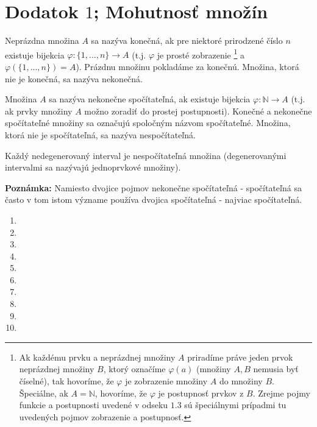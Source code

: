 \chapter{Dodatok $1$; Mohutnosť množín}

Neprázdna množina $A$ sa nazýva konečná, ak pre niektoré prirodzené číslo $n$ existuje bijekcia $\varphi:\{1,...,n\}\rightarrow A$ (t.j. $\varphi$ je prosté zobrazenie \footnote{Ak každému prvku a neprázdnej množiny $A$ priradíme práve jeden prvok neprázdnej množiny $B$, ktorý označíme $\varphi (a)$ (množiny $A,B$ nemusia byť číselné), tak hovoríme, že $\varphi$ je zobrazenie množiny $A$ do množiny $B$. Špeciálne, ak $A=\mathbb{N}$, hovoríme, že $\varphi$ je postupnosť prvkov z $B$. Zrejme pojmy funkcie a postupnosti uvedené v odseku $1.3$ sú špeciálnymi prípadmi tu uvedených pojmov zobrazenie a postupnosť.} a $\varphi(\{1,...,n\})=A$). Prázdnu množinu pokladáme za konečnú. Množina, ktorá nie je konečná, sa nazýva nekonečná.

Množina $A$ sa nazýva nekonečne spočítateľná, ak existuje bijekcia $\varphi:\mathbb{N}\rightarrow A$ (t.j. ak prvky množiny $A$ možno zoradiť do prostej postupnosti). Konečné a nekonečne spočítateľné množiny sa označujú spoločným názvom spočítateľné. Množina, ktorá nie je spočítateľná, sa nazýva nespočítateľná.

\begin{veta}
Každý nedegenerovaný interval je nespočítateľná množina (degenerovanými intervalmi sa nazývajú jednoprvkové množiny).
\end{veta}

\textbf{Poznámka:} Namiesto dvojice pojmov nekonečne spočítateľná - spočítateľná
sa často v tom istom význame používa dvojica spočítateľná - najviac spočítateľná.

\begin{enumerate}[resume]
  \item {}
  \item {}
  \item {}
  \item {}
  \item {}
  \item {}
  \item {}
  \item {}
  \item {}
  \item {}
\end{enumerate}
